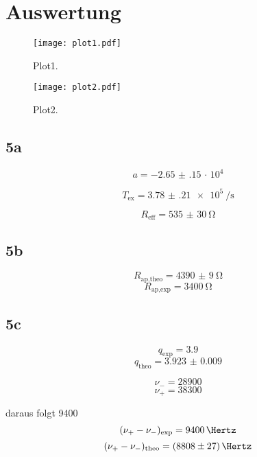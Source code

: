 \section{Auswertung}
\label{sec:Auswertung}

\begin{figure}
  \centering
  \texttt{[image: plot1.pdf]}
  \caption{Plot1.}
  \label{fig:plot1}
\end{figure}

\begin{figure}
  \centering
  \texttt{[image: plot2.pdf]}
  \caption{Plot2.}
  \label{fig:plot2}
\end{figure}


\subsection{5a}
\begin{equation}
   a = \num{-2.65(15)}\, \cdot\, 10^{4}
\end{equation}

\begin{equation}
   T_{\text{ex}} = \SI{3.78(21)e5}{\per\second}
\end{equation}

\begin{equation}
R_{\text{eff}} = \SI{535(30)}{\ohm}
\end{equation}


\subsection{5b}

\begin{equation}
  R_{\text{ap,theo}} = \SI{4390(9)}{\ohm}
  \end{equation}
\begin{equation}
  R_{\text{ap,exp}} = \SI{3400}{\ohm}
\end{equation}


\subsection{5c}

\begin{equation}
  q_{\text{exp}} = 3.9
\end{equation}
\begin{equation}
  q_{\text{theo}} = \num{3.923(9)}
\end{equation}



\begin{equation}
  \nu_{-} = 28900
\end{equation}
\begin{equation}
  \nu_{+} = 38300
\end{equation}

daraus folgt 9400
\begin{equation}
  (\nu_{+}-\nu_{-})_{\text{exp}} = \SI{9400}{\Hertz}
\end{equation}
\begin{equation}
  (\nu_{+}-\nu_{-})_{\text{theo}} = \SI{8808(27)}{\Hertz}
\end{equation}
